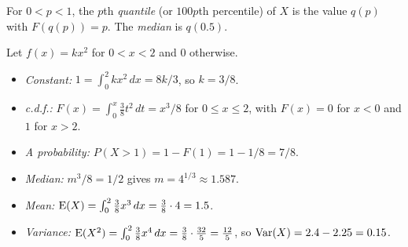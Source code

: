 \begin{definition}[Quantiles]
For $0<p<1$, the $p$th \emph{quantile} (or $100p$th percentile) of $X$ is the value $q(p)$
with $F(q(p)) = p$. The \emph{median} is $q(0.5)$.
\end{definition}

\begin{example}
Let $f(x) = kx^2$ for $0 < x < 2$ and $0$ otherwise.
\begin{itemize}
  \item \emph{Constant:} $1 = \int_0^2 kx^2\,dx = 8k/3$, so $k = 3/8$.
  \item \emph{c.d.f.:} $F(x) = \int_0^x \frac38 t^2\,dt = x^3/8$ for $0\le x\le 2$, with
        $F(x) = 0$ for $x<0$ and $1$ for $x > 2$.
  \item \emph{A probability:} $P(X > 1) = 1 - F(1) = 1 - 1/8 = 7/8$.
  \item \emph{Median:} $m^3/8 = 1/2$ gives $m = 4^{1/3} \approx 1.587$.
  \item \emph{Mean:} $\operatorname{E}(X) = \int_0^2 \frac38 x^3\,dx = \frac38\cdot 4 = 1.5$.
  \item \emph{Variance:} $\operatorname{E}(X^2) = \int_0^2\frac38x^4\,dx = \frac38\cdot\frac{32}{5}
        = \frac{12}{5}$, so $\operatorname{Var}(X) = 2.4 - 2.25 = 0.15$.
\end{itemize}
\end{example}

